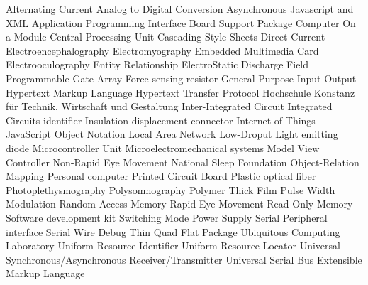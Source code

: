 \begin{acronym}
   {Alternating Current}
   {Analog to Digital Conversion}
   {Asynchronous Javascript and XML}
   {Application Programming Interface}
   {Board Support Package}
   {Computer On a Module}
   {Central Processing Unit}
   {Cascading Style Sheets}
   {Direct Current}
   {Electroencephalography}
   {Electromyography}
   {Embedded Multimedia Card}
   {Electrooculography}
   {Entity Relationship}
   {ElectroStatic Discharge}
   {Field Programmable Gate Array}
   {Force sensing resistor}
   {General Purpose Input Output}
   {Hypertext Markup Language}
   {Hypertext Transfer Protocol}
   {Hochschule Konstanz f\"ur Technik, Wirtschaft und Gestaltung}
   {Inter-Integrated Circuit}
   {Integrated Circuits}
   {identifier}
   {Insulation-displacement connector}
   {Internet of Things}
   {JavaScript Object Notation}
   {Local Area Network}
   {Low-Droput}
   {Light emitting diode}
   {Microcontroller Unit}
   {Microelectromechanical systems}
   {Model View Controller}
   {Non-Rapid Eye Movement}
   {National Sleep Foundation}
   {Object-Relation Mapping}
   {Personal computer}
   {Printed Circuit Board}
   {Plastic optical fiber}
   {Photoplethysmography}
   {Polysomnography}
   {Polymer Thick Film}
   {Pulse Width Modulation}
   {Random Access Memory}
   {Rapid Eye Movement}
   {Read Only Memory}
   {Software development kit}
   {Switching Mode Power Supply}
   {Serial Peripheral interface}
   {Serial Wire Debug}  
   {Thin Quad Flat Package}
   {Ubiquitous Computing Laboratory}
   {Uniform Resource Identifier}
   {Uniform Resource Locator}
   {Universal Synchronous/Asynchronous Receiver/Transmitter}
   {Universal Serial Bus}
   {Extensible Markup Language}
\end{acronym}

\newpage